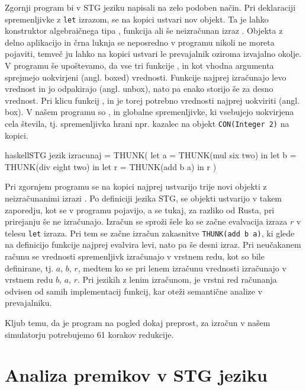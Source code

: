Zgornji program bi v STG jeziku napisali na zelo podoben način. Pri deklaraciji spremenljivke z \texttt{let} izrazom, se na kopici ustvari nov objekt. Ta je lahko konstruktor algebraičnega tipa , funkcija  ali še neizračunan izraz . Objekta z delno aplikacijo  in črna luknja  se neposredno v programu nikoli ne moreta pojaviti, temveč ju lahko na kopici ustvari le prevajalnik oziroma izvajalno okolje. V programu še upoštevamo, da vse tri funkcije ,  in  kot vhodna argumenta sprejmejo uokvirjeni (angl. boxed) vrednosti. Funkcije najprej izračunajo levo vrednost in jo odpakirajo (angl. unbox), nato pa enako storijo še za desno vrednost. Pri klicu funkcij ,  in  je torej potrebno vrednosti najprej uokviriti (angl. box). V našem programu so ,  in  globalne spremenljivke, ki vsebujejo uokvirjena cela števila, tj. spremenljivka  hrani npr. kazalec na objekt \texttt{CON(Integer 2)} na kopici.

\begin{code-box}{haskell}{STG jezik \cmark}
izracunaj = THUNK(
    let a = THUNK(mul six two) in
    let b = THUNK(div eight two) in
    let r = THUNK(add b a) in
        r
)
\end{code-box}

Pri zgornjem programu se na kopici najprej ustvarijo trije novi objekti z neizračunanimi izrazi . Po definiciji jezika STG, se objekti ustvarijo v takem zaporedju, kot se v programu pojavijo, a se tukaj, za razliko od Rusta, pri prirejanju še ne izračunajo. Izračun se sproži šele ko se začne evalvacija izraza $r$ v telesu \texttt{let} izraza. Pri tem se začne izračun zakasnitve \texttt{THUNK(add b a)}, ki glede na definicijo funkcije  najprej evalvira levi, nato pa še desni izraz. Pri neučakanem računu se vrednosti spremenljivk izračunajo v vrstnem redu, kot so bile definirane, tj. $a$, $b$, $r$, medtem ko se pri lenem izračunu vrednosti izračunajo v vrstnem redu $b$, $a$, $r$. Pri jezikih z lenim izračunom, je vrstni red računanja odvisen od samih implementacij funkcij, kar oteži semantične analize v prevajalniku.

Kljub temu, da je program na pogled dokaj preprost, za izračun v našem simulatorju potrebujemo 61 korakov redukcije.

\section{Analiza premikov v STG jeziku}
\label{sec:analiza-premikov}

